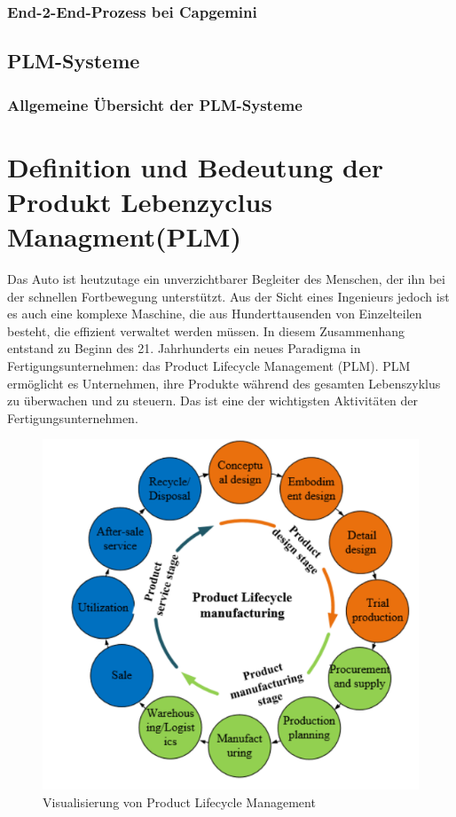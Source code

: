 \documentclass[a4paper, 12pt]{scrartcl}
\begin{document}
	\subsubsection{End-2-End-Prozess bei Capgemini}
	\newpage
	\subsection{PLM-Systeme}
	\subsubsection{Allgemeine Übersicht der PLM-Systeme}
	\section*{\normalsize Definition und Bedeutung der Produkt Lebenzyclus Managment(PLM)}
Das Auto ist heutzutage ein unverzichtbarer Begleiter des Menschen, der ihn bei der schnellen Fortbewegung unterstützt. Aus der Sicht eines Ingenieurs jedoch ist es auch eine komplexe Maschine, die aus Hunderttausenden von Einzelteilen besteht, die effizient verwaltet werden müssen. In diesem Zusammenhang entstand zu Beginn des 21. Jahrhunderts ein neues Paradigma in Fertigungsunternehmen: das Product Lifecycle Management (PLM). PLM ermöglicht es Unternehmen, ihre Produkte während des gesamten Lebenszyklus zu überwachen und zu steuern. Das ist eine der wichtigsten Aktivitäten der Fertigungsunternehmen.
	\begin{figure}[h!]
	\begin{center}
		\includegraphics[width=12cm]{PLM.png}
		\caption{Visualisierung von Product Lifecycle Management}
		\label{PLM}
	\end{center}
\end{figure}%
\newline
\end{document}
